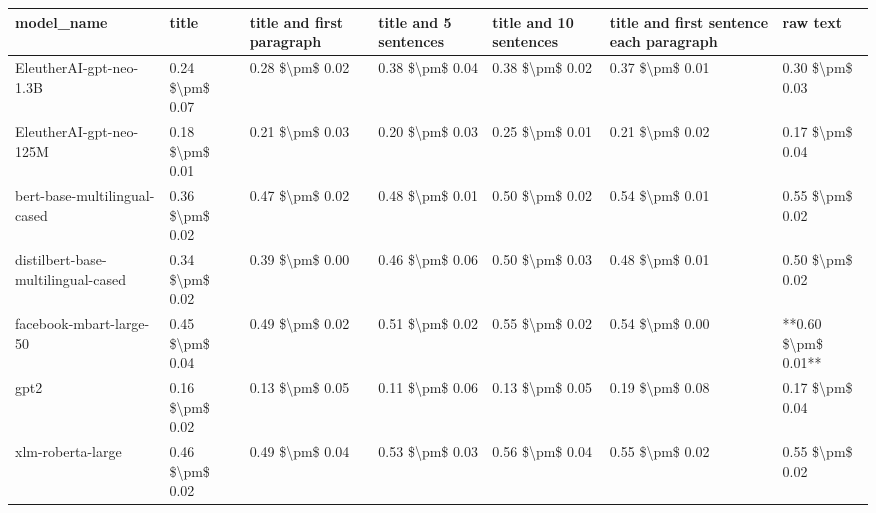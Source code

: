 \begin{tabular}{lllllll}
\toprule
                        model\_name &           title & title and first paragraph & title and 5 sentences & title and 10 sentences & title and first sentence each paragraph &            raw text \\
\midrule
           EleutherAI-gpt-neo-1.3B & 0.24 \$\textbackslash pm\$ 0.07 &           0.28 \$\textbackslash pm\$ 0.02 &       0.38 \$\textbackslash pm\$ 0.04 &        0.38 \$\textbackslash pm\$ 0.02 &                         0.37 \$\textbackslash pm\$ 0.01 &     0.30 \$\textbackslash pm\$ 0.03 \\
           EleutherAI-gpt-neo-125M & 0.18 \$\textbackslash pm\$ 0.01 &           0.21 \$\textbackslash pm\$ 0.03 &       0.20 \$\textbackslash pm\$ 0.03 &        0.25 \$\textbackslash pm\$ 0.01 &                         0.21 \$\textbackslash pm\$ 0.02 &     0.17 \$\textbackslash pm\$ 0.04 \\
      bert-base-multilingual-cased & 0.36 \$\textbackslash pm\$ 0.02 &           0.47 \$\textbackslash pm\$ 0.02 &       0.48 \$\textbackslash pm\$ 0.01 &        0.50 \$\textbackslash pm\$ 0.02 &                         0.54 \$\textbackslash pm\$ 0.01 &     0.55 \$\textbackslash pm\$ 0.02 \\
distilbert-base-multilingual-cased & 0.34 \$\textbackslash pm\$ 0.02 &           0.39 \$\textbackslash pm\$ 0.00 &       0.46 \$\textbackslash pm\$ 0.06 &        0.50 \$\textbackslash pm\$ 0.03 &                         0.48 \$\textbackslash pm\$ 0.01 &     0.50 \$\textbackslash pm\$ 0.02 \\
           facebook-mbart-large-50 & 0.45 \$\textbackslash pm\$ 0.04 &           0.49 \$\textbackslash pm\$ 0.02 &       0.51 \$\textbackslash pm\$ 0.02 &        0.55 \$\textbackslash pm\$ 0.02 &                         0.54 \$\textbackslash pm\$ 0.00 & **0.60 \$\textbackslash pm\$ 0.01** \\
                              gpt2 & 0.16 \$\textbackslash pm\$ 0.02 &           0.13 \$\textbackslash pm\$ 0.05 &       0.11 \$\textbackslash pm\$ 0.06 &        0.13 \$\textbackslash pm\$ 0.05 &                         0.19 \$\textbackslash pm\$ 0.08 &     0.17 \$\textbackslash pm\$ 0.04 \\
                 xlm-roberta-large & 0.46 \$\textbackslash pm\$ 0.02 &           0.49 \$\textbackslash pm\$ 0.04 &       0.53 \$\textbackslash pm\$ 0.03 &        0.56 \$\textbackslash pm\$ 0.04 &                         0.55 \$\textbackslash pm\$ 0.02 &     0.55 \$\textbackslash pm\$ 0.02 \\
\bottomrule
\end{tabular}
